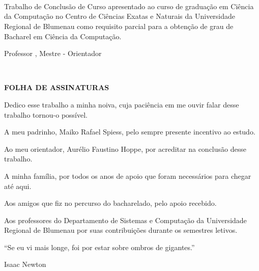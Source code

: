\documentclass[notes.tex]{subfiles}
\renewcommand{\imprimircapa}{

    \DoubleSpacing

    \begin{centering}

        {\bfseries \MakeUppercase{\imprimirinstituicao}\par}
    
        \vspace*{\fill} \vspace*{\fill} \vspace*{\fill} \vspace*{\fill}
        \vspace*{\fill} \vspace*{\fill} \vspace*{\fill}
    
        \bfseries\LARGE\MakeUppercase{\imprimirtitulo}\\
    
        \vspace*{\fill}

        \begin{flushright}
            \bfseries \MakeUppercase{\imprimirautor}
        \end{flushright}   

        \vspace*{\fill} \vspace*{\fill} \vspace*{\fill} \vspace*{\fill}
        \vspace*{\fill} \vspace*{\fill}

        \SingleSpace

        {\bfseries \MakeUppercase{\imprimirlocal} \\ \MakeUppercase{\imprimirdata} }
        \vspace*{\fill}

    \end{centering}
    \pdfbookmark[0]{Capa}{}
    \pagebreak
}
\renewcommand{\imprimirfolhaderosto}{

    \SingleSpace
    \begin{centering}

        {\bfseries \MakeUppercase{\imprimirautor}\par}
    
        \vspace*{\fill} \vspace*{\fill}
    
        {\bfseries\LARGE\MakeUppercase{\imprimirtitulo}}\\
    
        \vspace*{\fill}

        \begin{flushright}
            \parbox{0.5\textwidth}{%
                Trabalho de Conclusão de Curso apresentado ao curso de graduação em Ciência da Computação no Centro de Ciências Exatas e Naturais da Universidade Regional de Blumenau como requisito parcial para a obtenção de grau de Bacharel em Ciência da Computação.
            }
        \end{flushright}   

        \begin{flushright}
            \parbox{\textwidth*3/5}{%
                Professor \imprimirorientador, Mestre - Orientador
            }
        \end{flushright}   

        \vspace*{\fill} \vspace*{\fill} \vspace*{\fill}
        \vspace*{\fill} \vspace*{\fill} \vspace*{\fill}

        {\bfseries \MakeUppercase{\imprimirlocal} \\ \MakeUppercase{\imprimirdata} }

    \end{centering}
    \pagebreak
}
\newcommand{\imprimirfolhadeassinaturas}{
    \SingleSpace
    \begin{centering}
        \vspace*{\fill} 
        {\bfseries\LARGE\MakeUppercase{Folha de assinaturas}} 
        \vspace*{\fill}
    \end{centering}
    \pagebreak
}
\begin{document}
\imprimircapa

\imprimirfolhaderosto

\imprimirfolhadeassinaturas

\begin{dedicatoria}
    \vspace*{\fill}
    \hfill
    \parbox{0.5\textwidth}{%
        Dedico esse trabalho a minha noiva, cuja paciência em me ouvir falar desse trabalho tornou-o possível.
    }
    \vspace*{\fill}
\end{dedicatoria}
\pagebreak

\DoubleSpacing
\begin{agradecimentos}
    A meu padrinho, Maiko Rafael Spiess, pelo sempre presente incentivo ao estudo.

    Ao meu orientador, Aurélio Faustino Hoppe, por acreditar na conclusão desse trabalho.

    A minha família, por todos os anos de apoio que foram necessários para chegar até aqui.

    Aos amigos que fiz no percurso do bacharelado, pelo apoio recebido.

    Aos professores do Departamento de Sistemas e Computação da Universidade Regional de Blumenau por suas contribuições durante os semestres letivos.
\end{agradecimentos}
\pagebreak

\SingleSpace
\begin{epigrafe}
    \vspace*{\fill}

    \hfill
    \parbox{0.51\textwidth}{%
    ``Se eu vi mais longe, foi por estar sobre ombros de gigantes.''
    }

    \begin{flushright}
    Isaac Newton
    \end{flushright}
    \vspace*{\fill}
\end{epigrafe}
\end{document}
